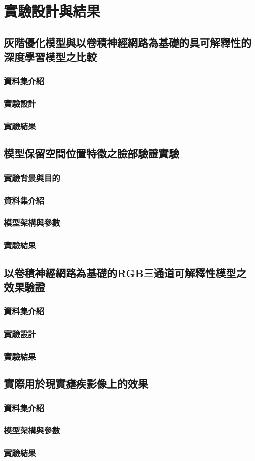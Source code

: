 \documentclass[class=NCU_thesis, crop=false]{standalone}
\begin{document}
\chapter{實驗設計與結果}
\section{灰階優化模型與以卷積神經網路為基礎的具可解釋性的深度學習模型之比較}
\subsection{資料集介紹}
\subsection{實驗設計}
\subsection{實驗結果}
\section{模型保留空間位置特徵之臉部驗證實驗}
\subsection{實驗背景與目的}
\subsection{資料集介紹}
\subsection{模型架構與參數}
\subsection{實驗結果}
\pagebreak
\section{以卷積神經網路為基礎的RGB三通道可解釋性模型之效果驗證}
\subsection{資料集介紹}
\subsection{實驗設計}
\subsection{實驗結果}
\section{實際用於現實瘧疾影像上的效果}
\subsection{資料集介紹}
\subsection{模型架構與參數}
\subsection{實驗結果}
\end{document}

